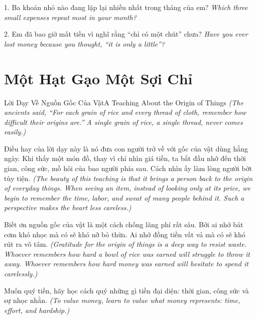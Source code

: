 \begin{tuhocnhanh}
1. Ba khoản nhỏ nào đang lặp lại nhiều nhất trong tháng của em? \textit{Which three small expenses repeat most in your month?}

2. Em đã bao giờ mất tiền vì nghĩ rằng ``chỉ có một chút'' chưa? \textit{Have you ever lost money because you thought, ``it is only a little''?}
\end{tuhocnhanh}
\ngancach

\section{Một Hạt Gạo Một Sợi Chỉ}
\begin{truyen}{Lời Dạy Về Nguồn Gốc Của Vật}{A Teaching About the Origin of Things}
\textit{(The ancients said, ``For each grain of rice and every thread of cloth, remember how difficult their origins are.'' A single grain of rice, a single thread, never comes easily.)}

Điều hay của lời dạy này là nó đưa con người trở về với gốc của vật dùng hằng ngày. Khi thấy một món đồ, thay vì chỉ nhìn giá tiền, ta bắt đầu nhớ đến thời gian, công sức, mồ hôi của bao người phía sau. Cách nhìn ấy làm lòng người bớt tùy tiện.
\textit{(The beauty of this teaching is that it brings a person back to the origin of everyday things. When seeing an item, instead of looking only at its price, we begin to remember the time, labor, and sweat of many people behind it. Such a perspective makes the heart less careless.)}

Biết ơn nguồn gốc của vật là một cách chống lãng phí rất sâu. Bởi ai nhớ bát cơm khó nhọc mà có sẽ khó nỡ bỏ thừa. Ai nhớ đồng tiền vất vả mà có sẽ khó rút ra vô tâm.
\textit{(Gratitude for the origin of things is a deep way to resist waste. Whoever remembers how hard a bowl of rice was earned will struggle to throw it away. Whoever remembers how hard money was earned will hesitate to spend it carelessly.)}
\end{truyen}

\begin{baihoc}
Muốn quý tiền, hãy học cách quý những gì tiền đại diện: thời gian, công sức và sự nhọc nhằn.
\textit{(To value money, learn to value what money represents: time, effort, and hardship.)}
\end{baihoc}

